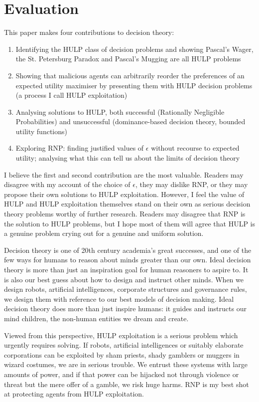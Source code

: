 \documentclass{article}
\begin{document}
\newpage\section{Evaluation}
This paper makes four contributions to decision theory:

\begin{enumerate}
\item Identifying the HULP class of decision problems and showing Pascal's Wager, the St. Petersburg Paradox and Pascal's Mugging are all HULP problems
\item Showing that malicious agents can arbitrarily reorder the preferences of an expected utility maximiser by presenting them with HULP decision problems (a process I call HULP exploitation)
\item Analysing solutions to HULP, both successful (Rationally Negligible Probabilities) and unsuccessful (dominance-based decision theory, bounded utility functions)
\item Exploring RNP: finding justified values of \(\epsilon\) without recourse to expected utility; analysing what this can tell us about the limits of decision theory
\end{enumerate}

I believe the first and second contribution are the most valuable. Readers may disagree with my account of the choice of \(\epsilon\), they may dislike RNP, or they may propose their own solutions to HULP exploitation. However, I feel the value of HULP and HULP exploitation themselves stand on their own as serious decision theory problems worthy of further research. Readers may disagree that RNP is the solution to HULP problems, but I hope most of them will agree that HULP is a genuine problem crying out for a genuine and uniform solution.

Decision theory is one of 20th century academia's great successes, and one of the few ways for humans to reason about minds greater than our own. Ideal decision theory is more than just an inspiration goal for human reasoners to aspire to. It is also our best guess about how to design and instruct other minds. When we design robots, artificial intelligences, corporate structures and governance rules, we design them with reference to our best models of decision making. Ideal decision theory does more than just inspire humans: it guides and instructs our mind children, the non-human entities we dream and create. 

Viewed from this perspective, HULP exploitation is a serious problem which urgently requires solving. If robots, artificial intelligences or suitably elaborate corporations can be exploited by sham priests, shady gamblers or muggers in wizard costumes, we are in serious trouble. We entrust these systems with large amounts of power, and if that power can be hijacked not through violence or threat but the mere offer of a gamble, we risk huge harms. RNP is my best shot at protecting agents from HULP exploitation.
\end{document}

